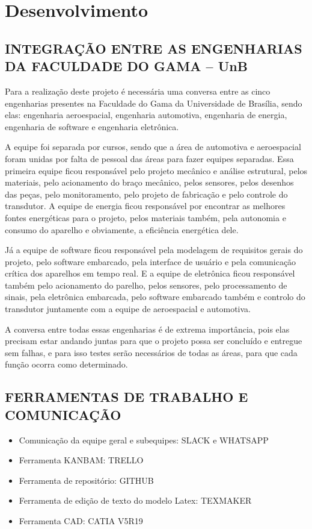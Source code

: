 \chapter{Desenvolvimento}

\section{INTEGRAÇÃO ENTRE AS ENGENHARIAS DA FACULDADE DO GAMA – UnB}

Para a realização deste projeto é necessária uma conversa entre as cinco engenharias presentes na Faculdade do Gama da Universidade de Brasília, sendo elas: engenharia aeroespacial, engenharia automotiva, engenharia de energia, engenharia de software e engenharia eletrônica. 

A equipe foi separada por cursos, sendo que a área de automotiva e aeroespacial foram unidas por falta de pessoal das áreas para fazer equipes separadas. Essa primeira equipe ficou responsável pelo projeto mecânico e análise estrutural, pelos materiais, pelo acionamento do braço mecânico, pelos sensores, pelos desenhos das peças, pelo monitoramento, pelo projeto de fabricação e pelo controle do transdutor. A equipe de energia ficou responsável por encontrar as melhores fontes energéticas para o projeto, pelos materiais também, pela autonomia e consumo do aparelho e obviamente, a eficiência energética dele.
	
Já a equipe de software ficou responsável pela modelagem de requisitos gerais do projeto, pelo software embarcado, pela interface de usuário e pela comunicação crítica dos aparelhos em tempo real. E a equipe de eletrônica ficou responsável também pelo acionamento do parelho, pelos sensores, pelo processamento de sinais, pela eletrônica embarcada, pelo software embarcado também e controlo do transdutor juntamente com a equipe de aeroespacial e automotiva.

A conversa entre todas essas engenharias é de extrema importância, pois elas precisam estar andando juntas para que o projeto possa ser concluído e entregue sem falhas, e para isso testes serão necessários de todas as áreas, para que cada função ocorra como determinado.

\section{FERRAMENTAS DE TRABALHO E COMUNICAÇÃO}

\begin{itemize}
\item Comunicação da equipe geral e subequipes: SLACK e WHATSAPP
\item Ferramenta KANBAM: TRELLO
\item Ferramenta de repositório: GITHUB
\item Ferramenta de edição de texto do modelo Latex: TEXMAKER
\item Ferramenta CAD: CATIA V5R19 
\end{itemize}

